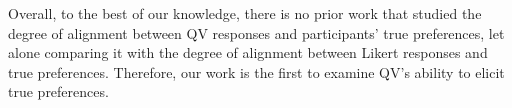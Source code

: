 Overall, to the best of our knowledge, there is no prior work that studied the degree of alignment between QV responses and participants' true preferences, let alone comparing it with the degree of alignment between Likert responses and true preferences. Therefore, our work is the first to examine QV's ability to elicit true preferences.






















